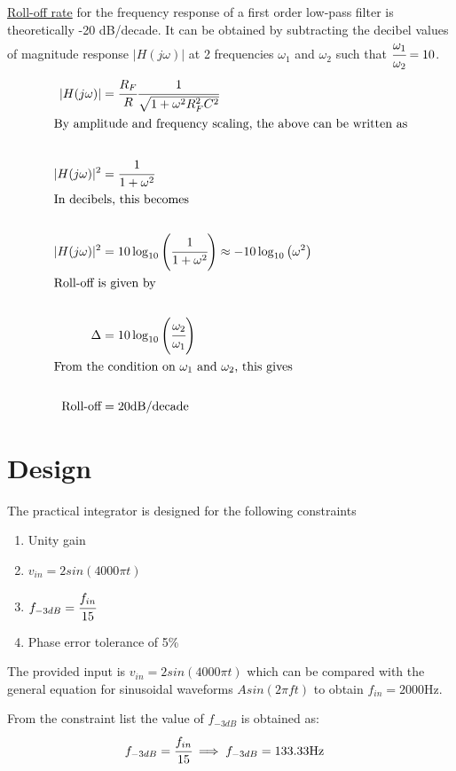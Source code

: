 \documentclass[12pt, titlepage]{article}
\theoremstyle{definition}
\begin{document}
    \underline{Roll-off rate} for the frequency response of a first order low-pass filter is theoretically -20 dB/decade.
    It can be obtained by subtracting the decibel values of magnitude response $|H(j\omega)|$ at 2 frequencies $\omega_1$ and $\omega_2$ such that $\cfrac{\omega_1}{\omega_2} = 10$.
    \begin{align*}
      |H(j\omega)| &= \cfrac{R_{F}}{R} \cfrac{1}{\sqrt{1+\omega^2 R_F^2 C^2}}\\
      \intertext{By amplitude and frequency scaling, the above can be written as}\\
      |H(j\omega)|^2 &= \cfrac{1}{1 + \omega^2}\\
      \intertext{In decibels, this becomes}\\
      |H(j\omega)|^2 &= 10\log_{10}\left(\cfrac{1}{1 + \omega^2}\right) \approx -10\log_{10}\left(\omega^2 \right)\\
      \intertext{Roll-off is given by }\\
      \Delta &= 10\log_{10}\left(\cfrac{\omega_2}{\omega_1}\right) \\
      \intertext{From the condition on $\omega_1$ and $\omega_2$, this gives}\\
      \text{Roll-off} &= 20 \text{dB/decade}
    \end{align*}

  \newpage
  \section{Design}
    The practical integrator is designed for the following constraints
    \begin{enumerate}[topsep=1pt, label=(\alph*)]
      \item Unity gain
      \item $v_{in} = 2sin(4000\pi t)$
      \item $f_{-3dB} = \cfrac{f_{in}}{15}$
      \item Phase error tolerance of 5\%
    \end{enumerate}

    The provided input is $v_{in} = 2 sin(4000\pi t)$ which can be compared with the general equation for sinusoidal waveforms $A sin(2\pi ft)$ to obtain \underline{$f_{in} = 2000\text{Hz}$}.

    From the constraint list the value of \underline{$f_{-3dB}$} is obtained as:
    \begin{align*}
      f_{-3dB} &= \cfrac{f_{in}}{15}
      \implies f_{-3dB} = 133.33\text{Hz}
    \end{align*}
\end{document}
